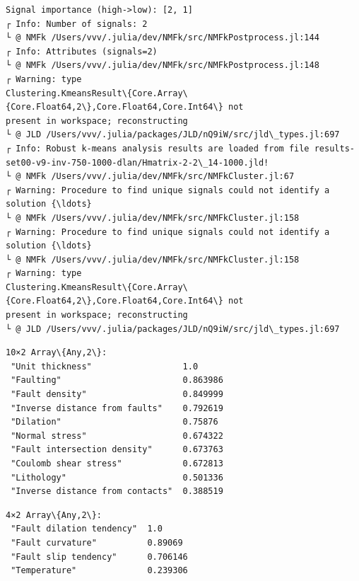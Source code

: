 \documentclass[11pt]{article}
\begin{document}
    \begin{Verbatim}[commandchars=\\\{\}]
Signal importance (high->low): [2, 1]
┌ Info: Number of signals: 2
└ @ NMFk /Users/vvv/.julia/dev/NMFk/src/NMFkPostprocess.jl:144
┌ Info: Attributes (signals=2)
└ @ NMFk /Users/vvv/.julia/dev/NMFk/src/NMFkPostprocess.jl:148
┌ Warning: type
Clustering.KmeansResult\{Core.Array\{Core.Float64,2\},Core.Float64,Core.Int64\} not
present in workspace; reconstructing
└ @ JLD /Users/vvv/.julia/packages/JLD/nQ9iW/src/jld\_types.jl:697
┌ Info: Robust k-means analysis results are loaded from file results-
set00-v9-inv-750-1000-dlan/Hmatrix-2-2\_14-1000.jld!
└ @ NMFk /Users/vvv/.julia/dev/NMFk/src/NMFkCluster.jl:67
┌ Warning: Procedure to find unique signals could not identify a solution {\ldots}
└ @ NMFk /Users/vvv/.julia/dev/NMFk/src/NMFkCluster.jl:158
┌ Warning: Procedure to find unique signals could not identify a solution {\ldots}
└ @ NMFk /Users/vvv/.julia/dev/NMFk/src/NMFkCluster.jl:158
┌ Warning: type
Clustering.KmeansResult\{Core.Array\{Core.Float64,2\},Core.Float64,Core.Int64\} not
present in workspace; reconstructing
└ @ JLD /Users/vvv/.julia/packages/JLD/nQ9iW/src/jld\_types.jl:697
    \end{Verbatim}

    
    \begin{Verbatim}[commandchars=\\\{\}]
10×2 Array\{Any,2\}:
 "Unit thickness"                  1.0
 "Faulting"                        0.863986
 "Fault density"                   0.849999
 "Inverse distance from faults"    0.792619
 "Dilation"                        0.75876
 "Normal stress"                   0.674322
 "Fault intersection density"      0.673763
 "Coulomb shear stress"            0.672813
 "Lithology"                       0.501336
 "Inverse distance from contacts"  0.388519
    \end{Verbatim}

    
    
    \begin{Verbatim}[commandchars=\\\{\}]
4×2 Array\{Any,2\}:
 "Fault dilation tendency"  1.0
 "Fault curvature"          0.89069
 "Fault slip tendency"      0.706146
 "Temperature"              0.239306
    \end{Verbatim}

    
    \begin{center}
    \end{center}
    { \hspace*{\fill} \\}
    
\end{document}
